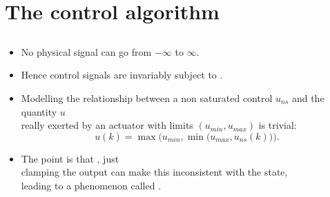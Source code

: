 \section{The control algorithm}
\subsection{}

\begin{frame}
\framesubtitleTC{}
\myPause
 \begin{itemize}[<+-| alert@+>]
 \item No physical signal can go from $-\infty$ to $\infty$.
 \item Hence control signals are invariably subject to .
 \item Modelling the relationship between a non saturated control $u_{ns}$ and the quantity $u$\\
       really exerted by an actuator with limits $(u_{min},u_{max})$ is trivial:
       \begin{displaymath}
        u(k) = \max \bigg( u_{min}, \min \big( u_{max}, u_{ns}(k) \big) \bigg).
       \end{displaymath}
 \item The point is that , just\\
       clamping the output can make this inconsistent with the state,\\
       leading to a phenomenon called . 
 \end{itemize}
\end{frame}

